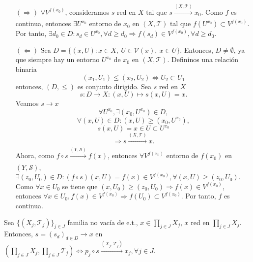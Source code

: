 \begin{dem}
  \begin{enumerate}[label=(\roman*)]
    \item []
    \item [$(\Rightarrow)$] $\forall V^{f(x_{0})}$, consideramos $s$ red en $X$ tal que $s \xrightarrow[]{ ( X, \mathcal{T} ) } x_{0}$. Como $f$ es continua, entonces $\exists U^{x_{0}}$ entorno de $x_{0}$ en $( X, \mathcal{T} )$ tal que $f(U^{x_{0}}) \subset V^{f(x_{0})}$. Por tanto, $\exists d_{0} \in D : s_{d} \in U^{x_{0}}, \forall d \geq d_{0} \Rightarrow f(s_{d}) \in V^{f(x_{0})}, \forall d \geq d_{0}$.
    \item [$(\Leftarrow)$] Sea $D = \{ (x, U) : x \in X, \ U \in \mathcal{V}(x), \ x \in U \}$. Entonces, $D \neq \emptyset$, ya que siempre hay un entorno $U^{x_{0}}$ de $x_{0}$ en $( X, \mathcal{T} )$. Defininos una relación binaria 
      \[ 
        (x_{1}, U_{1}) \leq (x_{2}, U_{2}) \Leftrightarrow U_{2} \subset U_{1}
      \] 
      entonces, $(D, \leq)$ es conjunto dirigido. Sea $s$ red en $X$
      \[ 
        s : D \to X : (x,U) \mapsto s(x, U) = x.
      \] 
      Veamos $s \rightarrow x$
      \[
        \forall U^{x_{0}}, \exists (x_{0}, U^{x_{0}}) \in D,
      \]
      \[
        \forall (x, U) \in D : (x, U) \geq (x_{0}, U^{x_{0}}),
      \]
      \[ 
        s(x, U) = x \in U \subset U^{x_{0}} 
      \] 
      \[
        \Rightarrow s \xrightarrow[]{ ( X, \mathcal{T} ) } x.
      \]
      Ahora, como $f \circ s \xrightarrow[]{ ( Y, \mathcal{S} ) } f(x)$, entonces $\forall V^{f(x_{0})}$ entorno de $f(x_{0})$ en $( Y, \mathcal{S} )$, $\exists (z_{0}, U_{0}) \in D : (f \circ s) (x, U) = f(x) \in V^{f(x_{0})}, \forall (x, U) \geq (z_{0}, U_{0})$. Como $\forall x \in U_{0}$ se tiene que $(x, U_{0}) \geq (z_{0}, U_{0}) \Rightarrow f(x) \in V^{f(x_{0})}$, entonces $\forall x \in U_{0}, f(x) \in V^{f(x_{0})} \Rightarrow f(U_{0}) \subset V^{f(x_{0})}$. Por tanto, $f$ es continua.
  \end{enumerate}
\end{dem}

\begin{prop}
  Sea $\{ ( X_{j}, \mathcal{T}_{j} ) \}_{j \in J}$ familia no vacía de e.t., $x \in \prod_{j \in J} X_{j}$, $x$ red en $\prod_{j \in J} X_{j}$. Entonces, $s = (s_{d})_{d \in D} \rightarrow x$ en $( \prod_{j \in J} X_{j}, \prod_{j \in J} \mathcal{T}_{j} ) \Leftrightarrow p_{j} \circ s \xrightarrow[]{ ( X_{j}, \mathcal{T}_{j} ) } x_{j}, \forall j \in J$.
\end{prop}


